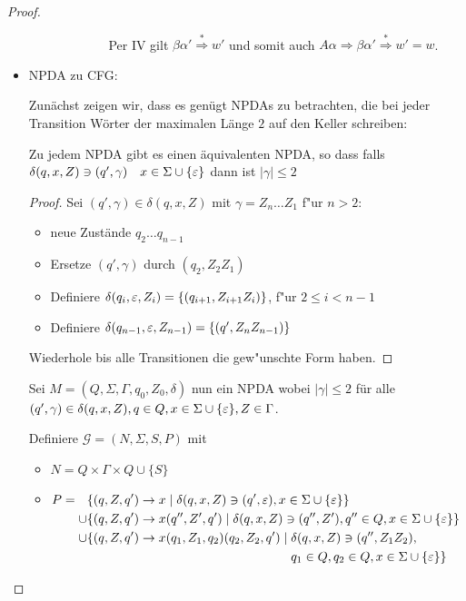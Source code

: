 \begin{proof}
\begin{itemize}
\begin{itemize}
\begin{description}
\begin{itemize}
      Per IV gilt $\beta\alpha' \stackrel{*}{\Longrightarrow} w'$ und somit auch $A\alpha \Longrightarrow \beta\alpha' \stackrel{*}{\Longrightarrow} w' = w$.
    \end{itemize}
    \end{description}
  \end{itemize}
  \item NPDA zu CFG:

    Zunächst zeigen wir, dass es genügt NPDAs zu betrachten, die bei jeder Transition Wörter der maximalen Länge $2$ auf den Keller schreiben:
\begin{lemma}
	Zu jedem \ac{NPDA} gibt es einen äquivalenten \ac{NPDA}, so dass
	falls $\delta(q,x,Z)\ni (q',\gamma) \quad x\in\Sigma\cup\{\varepsilon\}$
	dann ist $|\gamma| \le 2$
\end{lemma}
\begin{proof}
	Sei $(q',\gamma)\in\delta(q,x,Z)$ mit $\gamma = Z_n\dots Z_1$ f"ur $n>2$:
	\begin{itemize}
	\item 	neue Zustände $q_2\dots q_{n-1}$
	\item Ersetze $(q',\gamma)$ durch $(q_2, Z_2Z_1)$
	\item Definiere $\delta(q_i, \varepsilon, Z_i) = \{ (q_{i+1}, Z_{i+1}Z_i) \}$, f"ur $2\le i < n-1$
	\item Definiere $\delta(q_{n-1}, \varepsilon, Z_{n-1}) = \{ (q', Z_nZ_{n-1}) \}$
	\end{itemize}
	Wiederhole bis alle Transitionen die gew"unschte Form haben. \qedhere
\end{proof}

Sei $M = (Q, \Sigma, \Gamma, q_0, Z_0, \delta)$ nun ein NPDA wobei $|\gamma| \le 2$ für alle $(q', \gamma) \in \delta(q, x, Z), q \in Q, x \in \Sigma \cup \{\varepsilon\}, Z \in \Gamma$.

    Definiere $\mathcal{G} = (N, \Sigma, S, P)$ mit
    \begin{itemize}
    \item $N = Q \times \Gamma \times Q \cup \{S\}$ 
    \item $P =
      \begin{aligned}[t]
        &\{ (q, Z, q') \to x \mid \delta(q, x, Z) \ni (q', \varepsilon), x \in \Sigma \cup \{\varepsilon\} \} \\
        \cup & \{(q, Z, q') \to x(q'', Z', q') \mid \delta(q, x, Z) \ni (q'', Z'), q'' \in Q, x \in \Sigma \cup \{\varepsilon\}\} \\
        \cup & \{(q, Z, q') \to x(q_1,Z_1,q_2)(q_2, Z_2, q') \mid 
        \begin{aligned}[t]
          & \delta(q, x, Z) \ni (q'', Z_1Z_2), \\
          & q_1 \in Q, q_2 \in Q, x \in \Sigma \cup \{\varepsilon\} \}
        \end{aligned}
      \end{aligned}$
    \end{itemize}


\end{itemize}
\end{proof}
